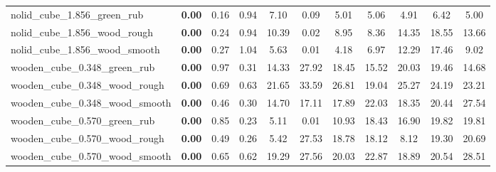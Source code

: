\begin{table}[H]
{\begin{tabular}{l cccccccccc}
        nolid\_cube\_1.856\_green\_rub & \textbf{0.00} & 0.16 & 0.94 & 7.10 & 0.09 & 5.01 & 5.06 & 4.91 & 6.42 & 5.00 \\
        nolid\_cube\_1.856\_wood\_rough & \textbf{0.00} & 0.24 & 0.94 & 10.39 & 0.02 & 8.95 & 8.36 & 14.35 & 18.55 & 13.66 \\
        nolid\_cube\_1.856\_wood\_smooth & \textbf{0.00} & 0.27 & 1.04 & 5.63 & 0.01 & 4.18 & 6.97 & 12.29 & 17.46 & 9.02 \\
        wooden\_cube\_0.348\_green\_rub & \textbf{0.00} & 0.97 & 0.31 & 14.33 & 27.92 & 18.45 & 15.52 & 20.03 & 19.46 & 14.68 \\
        wooden\_cube\_0.348\_wood\_rough & \textbf{0.00} & 0.69 & 0.63 & 21.65 & 33.59 & 26.81 & 19.04 & 25.27 & 24.19 & 23.21 \\
        wooden\_cube\_0.348\_wood\_smooth & \textbf{0.00} & 0.46 & 0.30 & 14.70 & 17.11 & 17.89 & 22.03 & 18.35 & 20.44 & 27.54 \\
        wooden\_cube\_0.570\_green\_rub & \textbf{0.00} & 0.85 & 0.23 & 5.11 & 0.01 & 10.93 & 18.43 & 16.90 & 19.82 & 19.81 \\
        wooden\_cube\_0.570\_wood\_rough & \textbf{0.00} & 0.49 & 0.26 & 5.42 & 27.53 & 18.78 & 18.12 & 8.12 & 19.30 & 20.69 \\
        wooden\_cube\_0.570\_wood\_smooth & \textbf{0.00} & 0.65 & 0.62 & 19.29 & 27.56 & 20.03 & 22.87 & 18.89 & 20.54 & 28.51 \\
        \bottomrule
    \end{tabular}
    }
\end{table}
